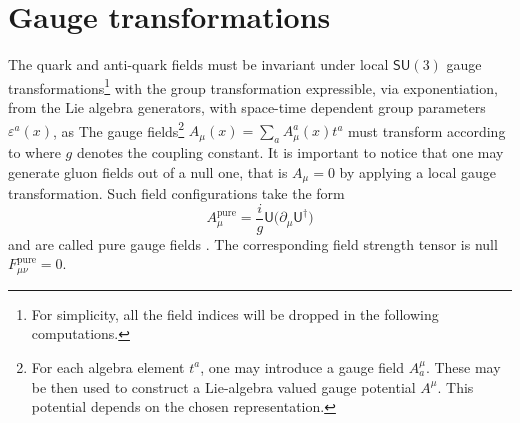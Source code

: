 \section{Gauge transformations} 
The quark and anti-quark fields must be invariant under local $\textsf{SU}(3)$ gauge transformations\footnote{For simplicity, all the field indices will be dropped in the following computations.}
with the group transformation expressible, via exponentiation, from the Lie algebra generators, with space-time dependent group parameters $\varepsilon^a(x)$, as 
The gauge fields\footnote{For each algebra element $t^a$, one may introduce a gauge field $A_a^\mu$. These may be then used to construct a Lie-algebra valued gauge potential $A^\mu$. This potential depends on the chosen representation.} $A_\mu(x)=\sum\limits_a A^a_\mu(x)t^a$ must transform according to
where $g$ denotes the coupling constant. It is important to notice that one may generate gluon fields out of a null one, that is $A_\mu=0$ by applying a local gauge transformation. Such field configurations take the form
\begin{equation*}
    A_\mu^{\text{pure}}=\frac{i}{g}\textsf{U}\big(\partial_\mu\textsf{U}^\dagger\big)
\end{equation*}
and are called pure gauge fields \cite{gelisqft,eichmann}. The corresponding field strength tensor is null $F_{\mu\nu}^{\text{pure}}=0$.

